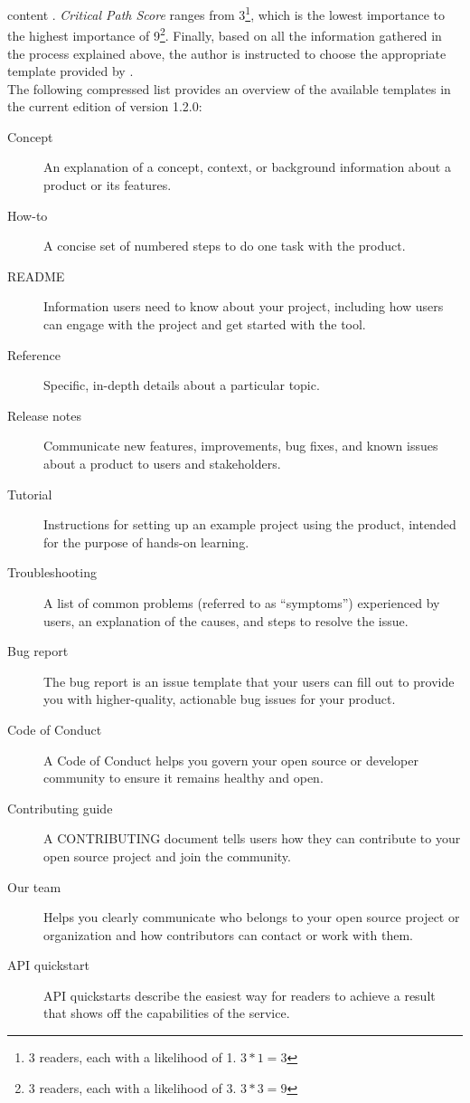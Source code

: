 content \cite{shorterGoodDocsProject2024}.
\textit{Critical Path Score} ranges from 3\footnote{3 readers, each with a likelihood of 1. $3*1=3$},
which is the lowest importance to the highest importance of 9\footnote{3 readers, each with a likelihood of 3. $3*3=9$}.
Finally, based on all the information gathered in the process explained above, the author is instructed to choose the appropriate template provided by \good\space \cite{shorterGoodDocsProject2024}.\\
The following compressed list provides an overview of the available templates in the current edition of \good\space version 1.2.0:
\begin{description}
	\item[Concept] An explanation of a concept, context, or background information about a product or its features.
	\item[How-to] A concise set of numbered steps to do one task with the product.
	\item[README] Information users need to know about your project, including how users can engage with the project and get started with the tool.
	\item[Reference] Specific, in-depth details about a particular topic.
	\item[Release notes] Communicate new features, improvements, bug fixes, and known issues about a product to users and stakeholders.
	\item[Tutorial] Instructions for setting up an example project using the product, intended for the purpose of hands-on learning.
	\item[Troubleshooting] A list of common problems (referred to as ``symptoms'') experienced by users, an explanation of the causes, and steps to resolve the issue.
	\item[Bug report] The bug report is an issue template that your users can fill out to provide you with higher-quality, actionable bug issues for your product.
	\item[Code of Conduct] A Code of Conduct helps you govern your open source or developer community to ensure it remains healthy and open.
	\item[Contributing guide] A CONTRIBUTING document tells users how they can contribute to your open source project and join the community.
	\item[Our team] Helps you clearly communicate who belongs to your open source project or organization and how contributors can contact or work with them.
	\item[API quickstart] API quickstarts describe the easiest way for readers to achieve a result that shows off the capabilities of the service.

\end{description}
